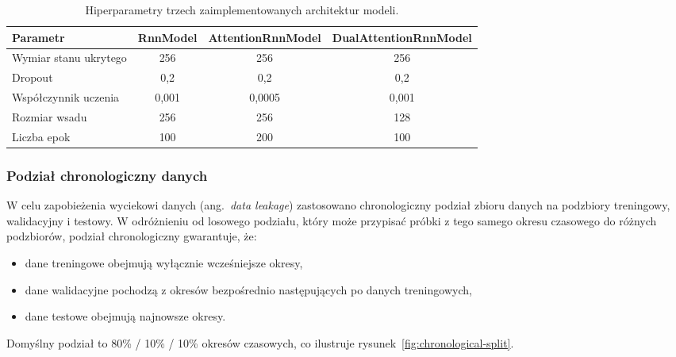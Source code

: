 \begin{table}[H]
\centering
\caption{Hiperparametry trzech zaimplementowanych architektur modeli.}
\label{tab:hyperparameters}
\begin{tabular}{lccc}
\toprule
\textbf{Parametr} & \textbf{RnnModel} & \textbf{AttentionRnnModel} & \textbf{DualAttentionRnnModel} \\
\midrule
Wymiar stanu ukrytego & 256 & 256 & 256 \\
Dropout & 0{,}2 & 0{,}2 & 0{,}2 \\
Współczynnik uczenia & 0{,}001 & 0{,}0005 & 0{,}001 \\
Rozmiar wsadu & 256 & 256 & 128 \\
Liczba epok & 100 & 200 & 100 \\
\bottomrule
\end{tabular}
\end{table}

\subsubsection{Podział chronologiczny danych}
\label{subsubsec:podzial-chronologiczny}

W celu zapobieżenia wyciekowi danych (ang.~\emph{data leakage}) zastosowano chronologiczny podział zbioru danych na podzbiory treningowy, walidacyjny i testowy. W odróżnieniu od losowego podziału, który może przypisać próbki z tego samego okresu czasowego do różnych podzbiorów, podział chronologiczny gwarantuje, że:

\begin{itemize}
    \item dane treningowe obejmują wyłącznie wcześniejsze okresy,
    \item dane walidacyjne pochodzą z okresów bezpośrednio następujących po danych treningowych,
    \item dane testowe obejmują najnowsze okresy.
\end{itemize}

Domyślny podział to 80\% / 10\% / 10\% okresów czasowych, co ilustruje rysunek~\ref{fig:chronological-split}.

